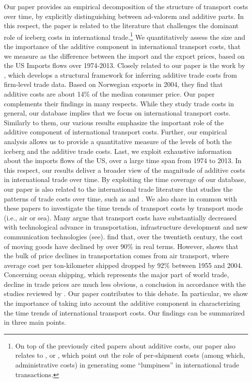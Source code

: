 \documentclass[a4paper,11pt]{article}
\begin{document}
Our paper provides an empirical decomposition of the structure of transport costs over time, by explicitly distinguishing between ad-valorem and additive parts. In this respect, the paper is related to the literature that challenges the dominant role of iceberg costs in international trade.\footnote{On top of the previously cited papers about additive costs, our paper also relates to \citet{Alessandria-et-al-AER-2010}, \citet{Hornok-et-al-RES-2015} or \citet{Hornok-et-al-JIE-2015}, which point out the role of per-shipment costs (among which, administrative costs) in generating some ``lumpiness'' in international trade transactions.}
We quantitatively assess the size and the importance of the additive component in international transport costs, that we measure as the difference between the import and the export prices, based on the US Imports flows over 1974-2013. Closely related to our paper is the work by \citet{Irrazabal_2015}, which develops a structural framework for inferring additive trade costs from firm-level trade data. Based on Norwegian exports in 2004, they find that additive costs are about 14\% of the median consumer price. Our paper complements their findings in many respects. While they study trade costs in general, our database implies that we focus on international transport costs. Similarly to them, our various results emphasize the important role of the additive component of international transport costs. Further, our empirical analysis allows us to provide a quantitative measure of the levels of both the iceberg and the additive trade costs. Last, we exploit exhaustive information about the imports flows of the US, over a large time span from 1974 to 2013. In this respect, our results deliver a broader view of the magnitude of additive costs in international trade over time. By exploiting the time coverage of our database, our paper is also related to the international trade literature that studies the patterns of trade costs over time, such as \cite{hummels2007} and \cite{Behar_Venables}. We also share in common with these papers to investigate the time trends of transport costs by transport mode (i.e., air or sea). Many argue that transport costs have substantially decreased with technological advance in transportation, infrastructure development and new communication technologies (see\citealp{Lafourcade_Thisse}). \cite{Glaeser04} find that, over the twentieth century, the cost of moving goods have declined by over 90\% in real terms. However, \cite{hummels2007} shows that the bulk of price declines in transportation comes from air transport, where average cost per ton-kilometer shipped dropped by 92\% between 1955 and 2004. Concerning ocean shipping, which represents the major part of world trade, decline in trade prices are much less obvious, a conclusion in accordance with the studies reviewed by \cite{Behar_Venables}. Our paper contributes to this debate. In particular, we show the importance of taking into account the additive component in characterizing the time trends of international transport costs. Our findings can be summarized in three main points.
\end{document}
